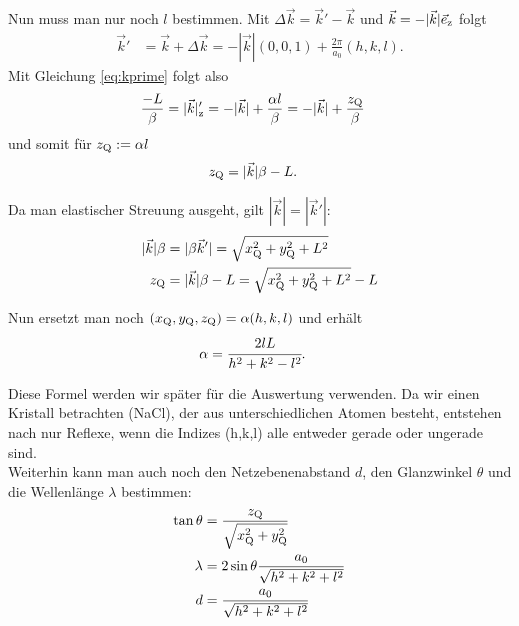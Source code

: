 Nun muss man nur noch $l$ bestimmen. Mit $\Delta\vec{k} = \vec{k}' -\vec{k}$ und $\vec{k}=-|\vec{k}|\vec{e}_\mathrm{z}$ folgt
\begin{align*}
\vec{k}' &= \vec{k} + \Delta\vec{k} = -|\vec{k}| (0,0,1) + \frac{2\pi}{a_0} (h,k,l).
\end{align*}
Mit Gleichung \ref{eq:kprime} folgt also
\begin{align*}
\frac{-L}{\beta} = |\vec{k}|_\mathrm{z}' &= -|\vec{k}| +\frac{\alpha l}{\beta} = -|\vec{k}| + \frac{z_\mathrm{Q}}{\beta}
\end{align*}
und somit für $z_\mathrm{Q} := \alpha l$
\begin{align*} 
z_\mathrm{Q} &= |\vec{k}|\beta - L.
\end{align*}

Da man elastischer Streuung ausgeht, gilt $|\vec{k}| = |\vec{k}'|$: 
\begin{align}
|\vec{k}|\beta &= |\beta\vec{k}'| = \sqrt{x_\mathrm{Q}^2 + y_\mathrm{Q}^2 + L^2} \nonumber\\
z_\mathrm{Q} &= |\vec{k}|\beta - L = \sqrt{x_\mathrm{Q}^2 + y_\mathrm{Q}^2 + L^2} - L
\label{eq:zq}
\end{align}

Nun ersetzt man noch $(x_\mathrm{Q}, y_\mathrm{Q}, z_\mathrm{Q}) = \alpha (h,k,l)$ und erhält
\begin{align}
\alpha &= \cfrac{2lL}{h^2 + k^2 - l^2}.
\label{eq:alpha}
\end{align}

Diese Formel werden wir später für die Auswertung verwenden. Da wir einen Kristall betrachten (NaCl), der aus unterschiedlichen Atomen besteht, entstehen nach \cite{ld} nur Reflexe, wenn  die Indizes (h,k,l) alle entweder gerade oder ungerade sind.\\

Weiterhin kann man auch noch den Netzebenenabstand $d$, den Glanzwinkel $\theta$ und die Wellenlänge $\lambda$ bestimmen\cite{ld}:
\begin{align}
\tan{\theta} &= \frac{z_\mathrm{Q}}{\sqrt{x_\mathrm{Q}^2+y_\mathrm{Q}^2}}\label{eq:theta}\\
\lambda &= 2\sin{\theta} \frac{a_0}{\sqrt{h^2+k^2+l^2}}\label{eq:lambda}\\
d &= \frac{a_0}{\sqrt{h^2+k^2+l^2}}\label{eq:d}
\end{align}

